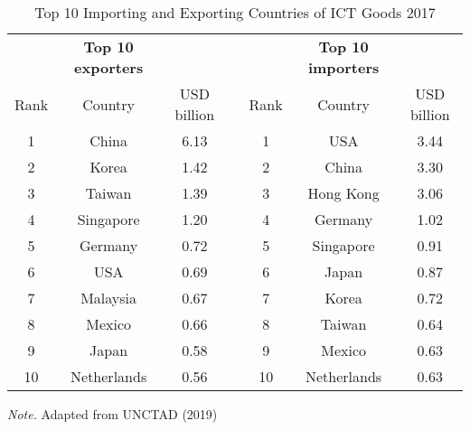 
\begin{table}[htb]
\caption{Top 10 Importing and Exporting Countries of ICT Goods 2017}
		\label{tab:top10_importers_exporters}
\centering
\begin{tabular}{ccccccc}
	\toprule
			&	\textbf{Top 10 exporters} &			&&			&	\textbf{Top 10 importers} &\\
	\cline{1-3} \cline{5-7}
	Rank	&	Country				&	USD billion	&&	Rank	&	Country				& USD billion \\
	\cline{1-3} \cline{5-7}
	1		&	China				&	6.13		&&	1		&	USA					& 3.44 \\
	2		&	Korea				&	1.42		&&	2		&	China				& 3.30 \\
	3		&	Taiwan				&	1.39		&&	3		&	Hong Kong			& 3.06 \\
	4		&	Singapore			&	1.20		&&	4		&	Germany				& 1.02 \\
	5		&	Germany				&	0.72		&&	5		&	Singapore			& 0.91 \\
	6		&	USA					&	0.69		&&	6		&	Japan				& 0.87 \\
	7		&	Malaysia			&	0.67		&&	7		&	Korea				& 0.72 \\
	8		&	Mexico				&	0.66		&&	8		&	Taiwan				& 0.64 \\
	9		&	Japan				&	0.58		&&	9		&	Mexico				& 0.63 \\
	10		&	Netherlands			&	0.56		&&	10		&	Netherlands			& 0.63 \\
	\bottomrule
	\end{tabular}
	\begin{flushleft}
	\textit{Note.} Adapted from UNCTAD (2019)
	\end{flushleft}
\end{table}